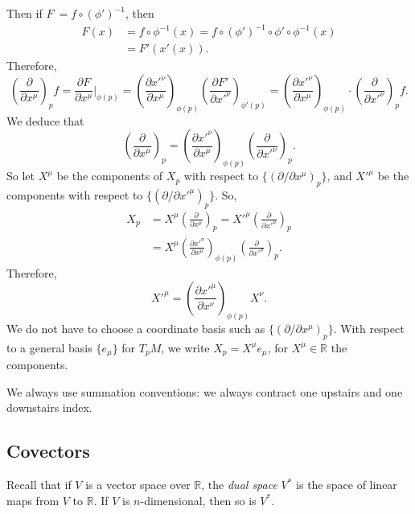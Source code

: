 \documentclass[12pt]{article}
\begin{document}
Then if $F\ = f \circ (\phi')^{-1}$, then
\begin{align*}
	F(x) & = f \circ \phi^{-1}(x) = f \circ (\phi')^{-1} \circ \phi' \circ \phi^{-1}(x)  \\
	     &= F'(x'(x)).
\end{align*}
Therefore,
\[
	\left( \frac{\partial}{\partial x^\mu} \right)_p f = \frac{\partial F}{\partial x^\mu} \biggr|_{\phi(p)} = \left( \frac{\partial x'^\nu}{ \partial x^\mu} \right)_{\phi(p)} \left( \frac{\partial F'}{\partial x'^\nu} \right)_{\phi'(p)} = \left( \frac{\partial x'^\nu}{ \partial x^\mu} \right)_{\phi(p)} \cdot \left( \frac{\partial}{\partial x'^\nu} \right)_p f.
\]
We deduce that
\[
\left( \frac{\partial}{\partial x^\mu} \right)_p = \left( \frac{\partial x'^\nu}{\partial x^\mu}\right)_{\phi(p)} \left( \frac{\partial}{\partial x'^\nu} \right)_p.
\]
So let $X^\mu$ be the components of $X_p$ with respect to $\{(\partial / \partial x^\mu)_p\}$, and $X'^\mu$ be the components with respect to $\{(\partial / \partial x'^\mu)_p\}$. So,
\begin{align*}
	X_p &= X^\mu \left( \frac{\partial}{\partial x^\mu} \right)_p = X'^\mu \left( \frac{\partial}{\partial x'^\mu} \right)_p \\
	    &= X^\mu \left( \frac{\partial x'^\sigma}{\partial x^\mu} \right)_{\phi(p)} \left( \frac{\partial}{\partial x'^\sigma} \right)_p.
\end{align*}
Therefore,
\[
X'^\mu = \left( \frac{\partial x'^\mu}{\partial x^\nu} \right)_{\phi(p)} X^\nu.
\]
We do not have to choose a coordinate basis such as $\{(\partial/\partial x^\mu)_p\}$. With respect to a general basis $\{e_\mu\}$ for $T_p M$, we write $X_p = X^\mu e_\mu$, for $X^\mu \in \mathbb{R}$ the components.

We always use summation conventions: we always contract one upstairs and one downstairs index.

\subsection{Covectors}%
\label{sub:cov}

Recall that if $V$ is a vector space over $\mathbb{R}$, the \emph{dual space} $V^\ast$ is the space of linear maps from $V$ to $\mathbb{R}$. If $V$ is $n$-dimensional, then so is $V^\ast$.
\end{document}

